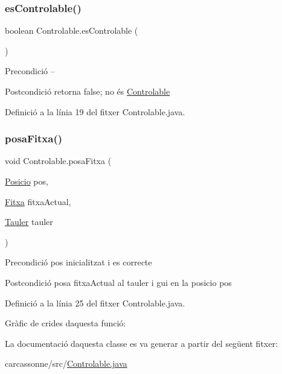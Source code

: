 \subsubsection{\texorpdfstring{es\+Controlable()}{esControlable()}}
{\footnotesize\ttfamily boolean Controlable.\+es\+Controlable (\begin{DoxyParamCaption}{ }\end{DoxyParamCaption})}

\begin{DoxyPrecond}{Precondició}
-- 
\end{DoxyPrecond}
\begin{DoxyPostcond}{Postcondició}
retorna false; no és \mbox{\hyperlink{class_controlable}{Controlable}} 
\end{DoxyPostcond}


Definició a la línia 19 del fitxer Controlable.\+java.

\mbox{\label{class_controlable_a2b6a322638a64197501904a8a8e8fac3}} 
\subsubsection{\texorpdfstring{posa\+Fitxa()}{posaFitxa()}}
{\footnotesize\ttfamily void Controlable.\+posa\+Fitxa (\begin{DoxyParamCaption}\item[{\mbox{\hyperlink{class_posicio}{Posicio}}}]{pos,  }\item[{\mbox{\hyperlink{class_fitxa}{Fitxa}}}]{fitxa\+Actual,  }\item[{\mbox{\hyperlink{class_tauler}{Tauler}}}]{tauler }\end{DoxyParamCaption})}

\begin{DoxyPrecond}{Precondició}
pos inicialitzat i es correcte 
\end{DoxyPrecond}
\begin{DoxyPostcond}{Postcondició}
posa fitxa\+Actual al tauler i gui en la posicio pos 
\end{DoxyPostcond}


Definició a la línia 25 del fitxer Controlable.\+java.

Gràfic de crides d\textquotesingle{}aquesta funció\+:


La documentació d\textquotesingle{}aquesta classe es va generar a partir del següent fitxer\+:\begin{DoxyCompactItemize}
\item 
carcassonne/src/\mbox{\hyperlink{_controlable_8java}{Controlable.\+java}}\end{DoxyCompactItemize}
